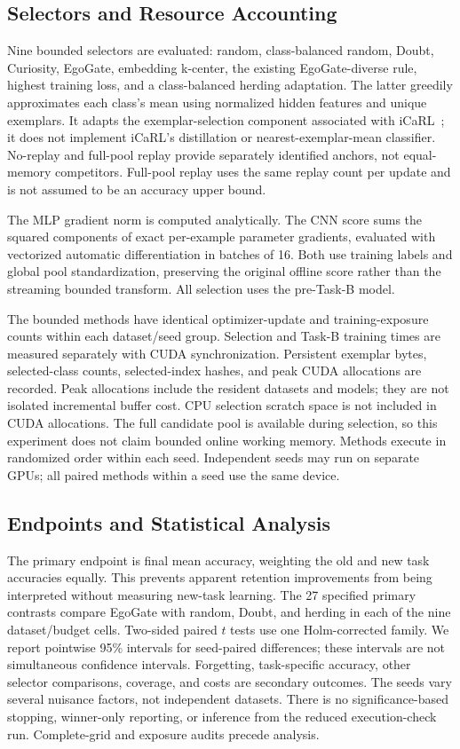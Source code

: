 \subsection{Selectors and Resource Accounting}
Nine bounded selectors are evaluated: random, class-balanced random, Doubt,
Curiosity, EgoGate, embedding k-center, the existing EgoGate-diverse rule,
highest training loss, and a class-balanced herding adaptation. The latter
greedily approximates each class's mean using normalized hidden features and
unique exemplars. It adapts the exemplar-selection component associated with
iCaRL~\cite{icarl}; it does not implement iCaRL's distillation or nearest-exemplar-mean
classifier. No-replay and full-pool replay provide separately identified anchors,
not equal-memory competitors. Full-pool replay uses the same replay count per
update and is not assumed to be an accuracy upper bound.

The MLP gradient norm is computed analytically. The CNN score sums the squared
components of exact per-example parameter gradients, evaluated with vectorized
automatic differentiation in batches of 16. Both use training labels and
global pool standardization, preserving the original offline score rather than
the streaming bounded transform. All selection uses the pre-Task-B model.

The bounded methods have identical optimizer-update and training-exposure
counts within each dataset/seed group. Selection and Task-B training times are
measured separately with CUDA synchronization. Persistent exemplar bytes,
selected-class counts, selected-index hashes, and peak CUDA allocations are
recorded. Peak allocations include the resident datasets and models; they are
not isolated incremental buffer cost. CPU selection scratch space is not
included in CUDA allocations. The full candidate pool is available during
selection, so this experiment does not claim bounded online working memory.
Methods execute in randomized order within each seed. Independent seeds may
run on separate GPUs; all paired methods within a seed use the same device.

\subsection{Endpoints and Statistical Analysis}
The primary endpoint is final mean accuracy, weighting the old and new task
accuracies equally. This prevents apparent retention improvements from being
interpreted without measuring new-task learning. The 27 specified primary
contrasts compare EgoGate with random, Doubt, and herding in each of the nine
dataset/budget cells. Two-sided paired $t$ tests use one Holm-corrected family.
We report pointwise 95\% intervals for seed-paired differences; these intervals
are not simultaneous confidence intervals. Forgetting, task-specific accuracy,
other selector comparisons, coverage, and costs are secondary outcomes.
The seeds vary several nuisance factors, not independent datasets. There is
no significance-based stopping, winner-only reporting, or inference from the
reduced execution-check run. Complete-grid and exposure audits precede analysis.
